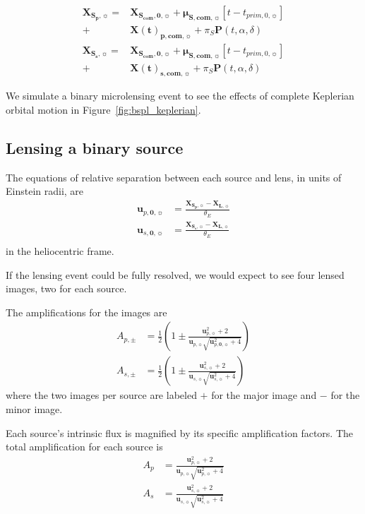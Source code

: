 \documentclass[twocolumn]{aastex701}
\newcommand{\vect}[1]{\boldsymbol{#1}}
\newcommand{\tnot}{t_{0,\sun}}
\newcommand{\thetaE}{\theta_E}
\newcommand{\mussysvec}{\vect{\mu}_{\boldsymbol{S, com},\sun}}
\newcommand{\Xsovec}{\vect{X}_{\boldsymbol{S,0},\sun}}
\newcommand{\Xlvec}{\vect{X}_{\boldsymbol{L},\sun}}
\newcommand{\Xscomvec}{\vect{X}_{\boldsymbol{S_{com},0},\sun}}
\newcommand{\Xspvec}{\vect{X}_{\boldsymbol{S_p},\sun}}
\newcommand{\Xcomp}{\vect{X(t)}_{\boldsymbol{p},\boldsymbol{com},\sun}}
\newcommand{\Xcoms}{\vect{X(t)}_{\boldsymbol{s},\boldsymbol{com},\sun}}
\newcommand{\Xssvec}{\vect{X}_{\boldsymbol{S_s},\sun}}
\newcommand{\upvec}{\vect{u}_{p,\sun}}
\newcommand{\usvec}{\vect{u}_{s,\sun}}
\newcommand{\upveco}{\vect{u}_{p,\boldsymbol{0},\sun}}
\newcommand{\usveco}{\vect{u}_{s,\boldsymbol{0},\sun}}
\newcommand{\tpnot}{t_{prim,0,\sun}}
\begin{document}


\begin{align}
    \Xspvec =& \Xscomvec + \mussysvec  [t - \tpnot] \nonumber \\
    +& \Xcomp + \pi_S \vect{P}(t, \alpha, \delta) \\
    \Xssvec =& \Xscomvec + \mussysvec [t - \tpnot] \nonumber \\
    +& \Xcoms + \pi_S \vect{P}(t, \alpha, \delta) 
\end{align}

We simulate a binary microlensing event to see the effects of complete Keplerian orbital motion in Figure~\ref{fig:bspl_keplerian}. 

\subsection{Lensing a binary source}
\label{sec:binsources_eqn}

The equations of relative separation between each source and lens, in units of Einstein radii, are
\begin{eqnarray}
\upveco &= \frac{\Xspvec-\Xlvec}{\thetaE} \\
\usveco &= \frac{\Xssvec-\Xlvec}{\thetaE} \\
\end{eqnarray}
in the heliocentric frame.

If the lensing event could be fully resolved, we would expect to see four lensed images, two for each source. 

The amplifications for the images are
\begin{eqnarray}
A_{p,\pm} &= \frac{1}{2} \left( 1 \pm \frac{\upvec^2 + 2}{\upvec \sqrt{\upveco^2 + 4}} \right) \\
A_{s,\pm} &= \frac{1}{2} \left( 1 \pm \frac{\usvec^2 + 2}{\usvec \sqrt{\usvec^2 + 4}} \right) 
\end{eqnarray}
where the two images per source are labeled $+$ for the major image and $-$ for the minor image.


Each source's intrinsic flux is magnified by its specific amplification factors. The total amplification for each source is
\begin{eqnarray}
 A_p &= \frac{\upvec^2 + 2}{\upvec \sqrt{\upvec^2 + 4}} \\
 A_s &= \frac{\usvec^2 + 2}{\usvec \sqrt{\usvec^2 + 4}}
\end{eqnarray}
\end{document}
